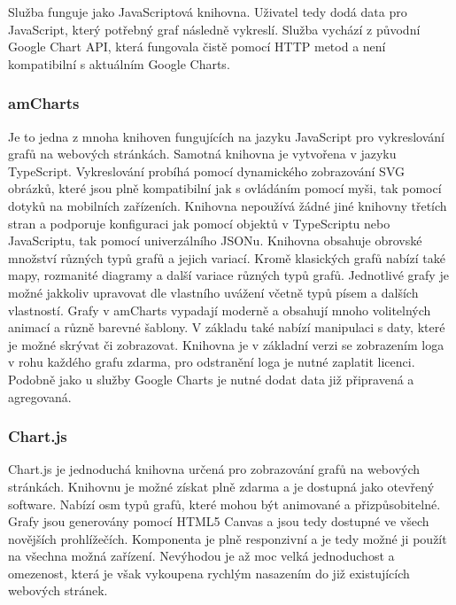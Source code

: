 \documentclass[czech,master,public,dept460,male,cpdeclaration,oneside]{diploma}
\begin{document}
Služba funguje jako JavaScriptová knihovna. Uživatel tedy dodá data pro JavaScript, který potřebný graf následně vykreslí. Služba vychází z původní Google Chart API, která fungovala čistě pomocí HTTP metod a není kompatibilní s aktuálním Google Charts. \cite{ref:google_charts}

\subsubsection{amCharts}
\label{sec:amcharts}
Je to jedna z mnoha knihoven fungujících na jazyku JavaScript pro vykreslování grafů na webových stránkách. Samotná knihovna je vytvořena v jazyku TypeScript. Vykreslování probíhá pomocí dynamického zobrazování SVG obrázků, které jsou plně kompatibilní jak s ovládáním pomocí myši, tak pomocí dotyků na mobilních zařízeních. Knihovna nepoužívá žádné jiné knihovny třetích stran a podporuje konfiguraci jak pomocí objektů v TypeScriptu nebo JavaScriptu, tak pomocí univerzálního JSONu. Knihovna obsahuje obrovské množství různých typů grafů a jejich variací. Kromě klasických grafů nabízí také mapy, rozmanité diagramy a další variace různých typů grafů. Jednotlivé grafy je možné jakkoliv upravovat dle vlastního uvážení včetně typů písem a dalších vlastností. Grafy v amCharts vypadají moderně a obsahují mnoho volitelných animací a různě barevné šablony.  V základu také nabízí manipulaci s daty, které je možné skrývat či zobrazovat. Knihovna je v základní verzi se zobrazením loga v rohu každého grafu zdarma, pro odstranění loga je nutné zaplatit licenci. Podobně jako u služby Google Charts je nutné dodat data již připravená a agregovaná. \cite{ref:amcharts_web}

\subsubsection{Chart.js}
\label{sec:chartjs}
Chart.js je jednoduchá knihovna určená pro zobrazování grafů na webových stránkách. Knihovnu je možné získat plně zdarma a je dostupná jako otevřený software. Nabízí osm typů grafů, které mohou být animované a přizpůsobitelné. Grafy jsou generovány pomocí HTML5 Canvas a jsou tedy dostupné ve všech novějších prohlížečích. Komponenta je plně responzivní a je tedy možné ji použít na všechna možná zařízení. Nevýhodou je až moc velká jednoduchost a omezenost, která je však vykoupena rychlým nasazením do již existujících webových stránek. \cite{ref:chartjs}
\end{document}
